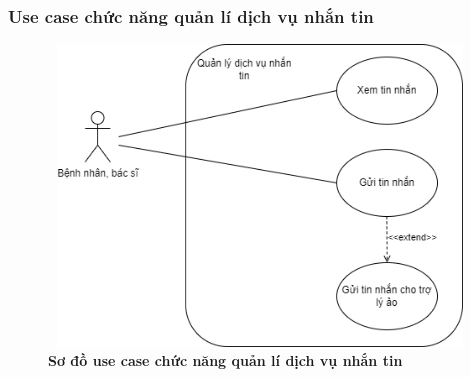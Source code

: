 \subsubsection{Use case chức năng quản lí dịch vụ nhắn tin}
  \begin{figure}[H]
    \centering
    \includegraphics[width=14.7cm,height=8cm]{Images/use_case/use_case_send_receive_message.png}
    \caption[Sơ đồ use case chức năng quản lí dịch vụ nhắn tin]{\bfseries \fontsize{12pt}{0pt}
    \selectfont Sơ đồ use case chức năng quản lí dịch vụ nhắn tin}
    \label{use_case_chat} %
  \end{figure}


